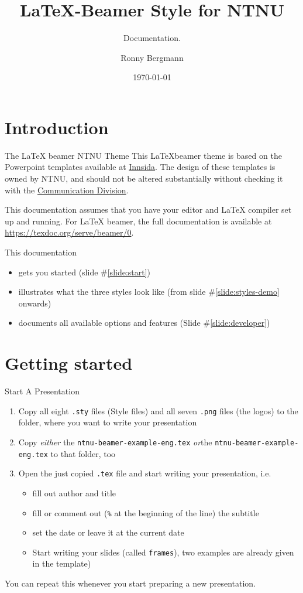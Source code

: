 \documentclass[aspectratio=169]{beamer}
\title{\LaTeX{}-Beamer Style for NTNU}
\subtitle{Documentation.}
\author{Ronny Bergmann}
\date{\today}
\begin{document}
	\maketitle
	\tableofcontents

	\section{Introduction}
		\begin{frame}{The \LaTeX{} beamer NTNU Theme}
			This \LaTeX beamer theme is based on the Powerpoint templates available at \href{https://innsida.ntnu.no/wiki/-/wiki/English/Create+NTNU+presentations\#section-Create+NTNU+presentations-Powerpoint+templates}{Innsida}.
			The design of these templates is owned by NTNU, and should not be altered
	substantially without checking it with the \href{https://www.ntnu.no/adm/komm}{Communication Division}.

			This documentation assumes that you have your editor and \LaTeX{} compiler set up and running. For \LaTeX{} beamer, the full documentation is available at \url{https://texdoc.org/serve/beamer/0}.

			This documentation
			\begin{itemize}
				\item gets you started (slide \#\ref{slide:start})
				\item illustrates what the three styles look like (from slide \#\ref{slide:styles-demo} onwards)
				\item documents all available options and features (Slide \#\ref{slide:developer})
			\end{itemize}
		\end{frame}
	\section{Getting started}
		\begin{frame}[fragile]{Start A Presentation}
			\label{slide:start}
			\begin{enumerate}
				\item Copy all eight \lstinline!.sty! files (Style files) and all seven \lstinline!.png! files (the logos) to the folder, where you want to write your presentation
				\item Copy \emph{either} the \lstinline!ntnu-beamer-example-eng.tex! \emph{or}the \lstinline!ntnu-beamer-example-eng.tex! to that folder, too
				\item Open the just copied \lstinline!.tex! file and start writing your presentation, i.e.
				\begin{itemize}
					\item fill out author and title
					\item fill or comment out (\lstinline!%! at the beginning of the line) the subtitle
					\item set the date or leave it at the current date
					\item Start writing your slides (called \lstinline!frames!), two examples are already given in the template)
				\end{itemize}
			\end{enumerate}
			You can repeat this whenever you start preparing a new presentation.
		\end{frame}
\end{document}

